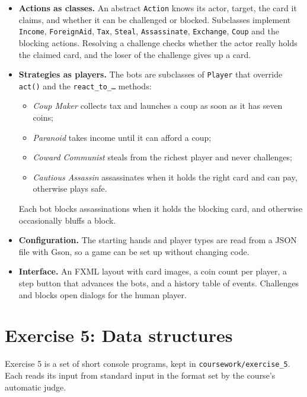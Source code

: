 \documentclass[11pt,a4paper]{article}
\begin{document}
\begin{itemize}
\item \textbf{Actions as classes.} An abstract \texttt{Action} knows its actor, target, the card it claims, and whether it can be challenged or blocked. Subclasses implement \texttt{Income}, \texttt{ForeignAid}, \texttt{Tax}, \texttt{Steal}, \texttt{Assassinate}, \texttt{Exchange}, \texttt{Coup} and the blocking actions. Resolving a challenge checks whether the actor really holds the claimed card, and the loser of the challenge gives up a card.
\item \textbf{Strategies as players.} The bots are subclasses of \texttt{Player} that override \texttt{act()} and the \texttt{react\_to\_\ldots} methods:
\begin{itemize}
\item \emph{Coup Maker} collects tax and launches a coup as soon as it has seven coins;
\item \emph{Paranoid} takes income until it can afford a coup;
\item \emph{Coward Communist} steals from the richest player and never challenges;
\item \emph{Cautious Assassin} assassinates when it holds the right card and can pay, otherwise plays safe.
\end{itemize}
Each bot blocks assassinations when it holds the blocking card, and otherwise occasionally bluffs a block.
\item \textbf{Configuration.} The starting hands and player types are read from a JSON file with Gson, so a game can be set up without changing code.
\item \textbf{Interface.} An FXML layout with card images, a coin count per player, a step button that advances the bots, and a history table of events. Challenges and blocks open dialogs for the human player.
\end{itemize}

\section{Exercise 5: Data structures}

Exercise 5 is a set of short console programs, kept in \texttt{coursework/exercise\_5}. Each reads its input from standard input in the format set by the course's automatic judge.
\end{document}
